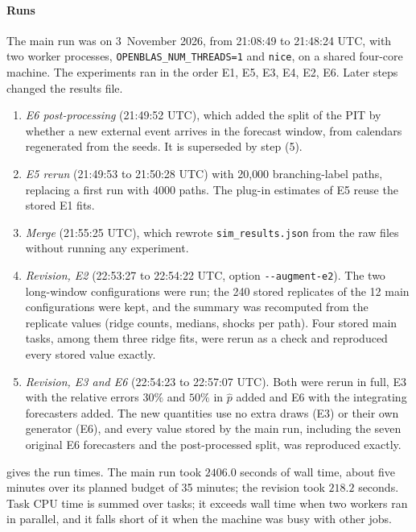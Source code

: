 \paragraph{Runs} The main run was on 3~November 2026, from 21:08:49 to 21:48:24 UTC, with
two worker processes, \texttt{OPENBLAS\_NUM\_THREADS=1} and \texttt{nice}, on a shared
four-core machine. The experiments ran in the order E1, E5, E3, E4, E2, E6. Later steps
changed the results file.
\begin{enumerate}[(1)]
  \item \emph{E6 post-processing} (21:49:52 UTC), which added the split of the PIT by
  whether a new external event arrives in the forecast window, from calendars regenerated
  from the seeds. It is superseded by step (5).
  \item \emph{E5 rerun} (21:49:53 to 21:50:28 UTC) with 20{,}000 branching-label paths,
  replacing a first run with 4000 paths. The plug-in estimates of E5 reuse the stored E1
  fits.
  \item \emph{Merge} (21:55:25 UTC), which rewrote \texttt{sim\_results.json} from the raw
  files without running any experiment.
  \item \emph{Revision, E2} (22:53:27 to 22:54:22 UTC, option \texttt{-{}-augment-e2}).
  The two long-window configurations were run; the 240 stored replicates of the 12 main
  configurations were kept, and the summary was recomputed from the replicate values (ridge
  counts, medians, shocks per path). Four stored main tasks, among them three ridge fits,
  were rerun as a check and reproduced every stored value exactly.
  \item \emph{Revision, E3 and E6} (22:54:23 to 22:57:07 UTC). Both were rerun in full,
  E3 with the relative errors $30\%$ and $50\%$ in $\hat p$ added and E6 with the
  integrating forecasters added. The new quantities use no extra draws (E3) or their own
  generator (E6), and every value stored by the main run, including the seven original E6
  forecasters and the post-processed split, was reproduced exactly.
\end{enumerate}
 gives the run times. The main run took $2406.0$ seconds of wall time,
about five minutes over its planned budget of 35 minutes; the revision took $218.2$
seconds. Task CPU time is summed over tasks; it exceeds wall time when two workers ran in
parallel, and it falls short of it when the machine was busy with other jobs.

